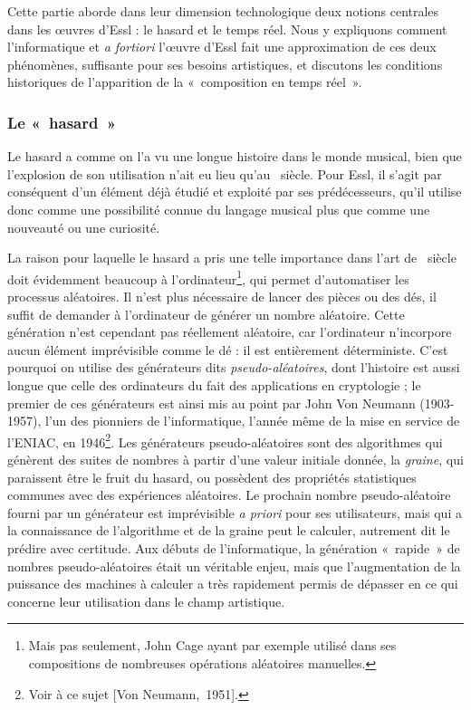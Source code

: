 \documentclass[a4paper,12pt]{article}
\newcommand{\guill}[1]{«~#1~»}
\newcommand{\cicite}[1]{{\footnotesize[#1]}}
\begin{document}
Cette partie aborde dans leur dimension technologique deux notions centrales dans les œuvres d'Essl : le hasard et le temps réel. Nous y expliquons comment l'informatique et \emph{a fortiori} l'œuvre d'Essl fait une approximation de ces deux phénomènes, suffisante pour ses besoins artistiques, et discutons les conditions historiques de l'apparition de la \guill{composition en temps réel}.

\subsubsection{Le \guill{hasard}}
\label{hasard}

Le hasard a comme on l'a vu une longue histoire dans le monde musical, bien que l'explosion de son utilisation n'ait eu lieu qu'au \XXe~siècle. Pour Essl, il s'agit par conséquent d'un élément déjà étudié et exploité par ses prédécesseurs, qu'il utilise donc comme une possibilité connue du langage musical plus que comme une nouveauté ou une curiosité.

La raison pour laquelle le hasard a pris une telle importance dans l'art de \XXe~siècle doit évidemment beaucoup à l'ordinateur\footnote{Mais pas seulement, John Cage ayant par exemple utilisé dans ses compositions de nombreuses opérations aléatoires manuelles.}, qui permet d'automatiser les processus aléatoires. Il n'est plus nécessaire de lancer des pièces ou des dés, il suffit de demander à l'ordinateur de générer un nombre aléatoire. Cette génération n'est cependant pas réellement aléatoire, car l'ordinateur n'incorpore aucun élément imprévisible comme le dé : il est entièrement déterministe. C'est pourquoi on utilise des générateurs dits \emph{pseudo-aléatoires}, dont l'histoire est aussi longue que celle des ordinateurs du fait des applications en cryptologie ; le premier de ces générateurs est ainsi mis au point par John Von Neumann (1903-1957), l'un des pionniers de l'informatique, l'année même de la mise en service de l'ENIAC, en 1946\footnote{Voir à ce sujet \cicite{Von Neumann,~1951}.}. Les générateurs pseudo-aléatoires sont des algorithmes qui génèrent des suites de nombres à partir d'une valeur initiale donnée, la \emph{graine}, qui paraissent être le fruit du hasard, ou possèdent des propriétés statistiques communes avec des expériences aléatoires. Le prochain nombre pseudo-aléatoire fourni par un générateur est imprévisible \emph{a priori} pour ses utilisateurs, mais qui a la connaissance de l'algorithme et de la graine peut le calculer, autrement dit le prédire avec certitude. Aux débuts de l'informatique, la génération \guill{rapide} de nombres pseudo-aléatoires était un véritable enjeu, mais que l'augmentation de la puissance des machines à calculer a très rapidement permis de dépasser en ce qui concerne leur utilisation dans le champ artistique.
\end{document}
